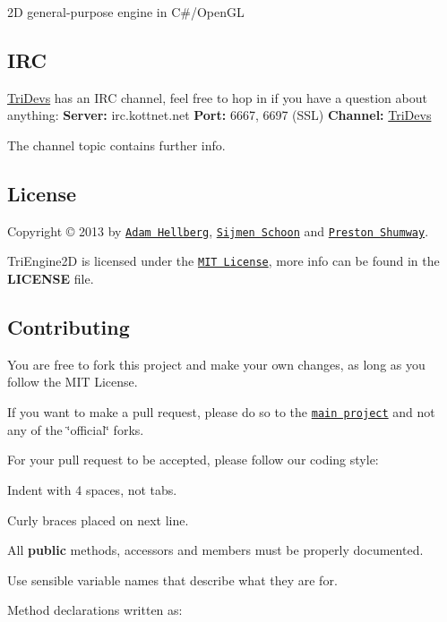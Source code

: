 2\-D general-\/purpose engine in C\#/\-Open\-G\-L

\subsection*{I\-R\-C}

\hyperlink{namespace_tri_devs}{Tri\-Devs} has an I\-R\-C channel, feel free to hop in if you have a question about anything\-: {\bfseries Server\-:} irc.\-kottnet.\-net {\bfseries Port\-:} 6667, 6697 (S\-S\-L) {\bfseries Channel\-:} \hyperlink{namespace_tri_devs}{Tri\-Devs}

The channel topic contains further info.

\subsection*{License}

Copyright © 2013 by \href{https://github.com/Sharparam}{\tt Adam Hellberg}, \href{https://github.com/Vijfhoek}{\tt Sijmen Schoon} and \href{https://github.com/anidude}{\tt Preston Shumway}.

Tri\-Engine2\-D is licensed under the \href{http://opensource.org/licenses/MIT}{\tt M\-I\-T License}, more info can be found in the {\bfseries L\-I\-C\-E\-N\-S\-E} file.

\subsection*{Contributing}

You are free to fork this project and make your own changes, as long as you follow the M\-I\-T License.

If you want to make a pull request, please do so to the \href{https://github.com/TriDevs/TriEngine2D}{\tt main project} and not any of the \char`\"{}official\char`\"{} forks.

For your pull request to be accepted, please follow our coding style\-:
\begin{DoxyItemize}
\item Indent with 4 spaces, not tabs.
\item Curly braces placed on next line.
\item All {\bfseries public} methods, accessors and members must be properly documented.
\item Use sensible variable names that describe what they are for.
\item Method declarations written as\-:
\end{DoxyItemize}

